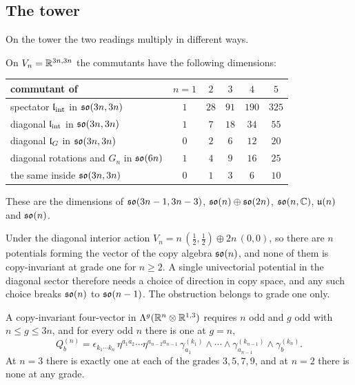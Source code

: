 \subsection{The tower}

On the tower the two readings multiply in different ways.

\begin{proposition}
\label{prop:commutantsn}
On $V_n=\mathbb{R}^{3n,3n}$ the commutants have the following dimensions:
\begin{center}
\begin{tabular}{@{}lccccc@{}}
\toprule
commutant of & $n=1$ & $2$ & $3$ & $4$ & $5$\\
\midrule
spectator $\mathfrak l_{\rm int}$ in $\mathfrak{so}(3n,3n)$ & $1$ & $28$ & $91$ & $190$ & $325$\\
diagonal $\mathfrak l_{\rm int}$ in $\mathfrak{so}(3n,3n)$ & $1$ & $7$ & $18$ & $34$ & $55$\\
diagonal $\mathfrak l_G$ in $\mathfrak{so}(3n,3n)$ & $0$ & $2$ & $6$ & $12$ & $20$\\
diagonal rotations and $G_n$ in $\mathfrak{so}(6n)$ & $1$ & $4$ & $9$ & $16$ & $25$\\
the same inside $\mathfrak{so}(3n,3n)$ & $0$ & $1$ & $3$ & $6$ & $10$\\
\bottomrule
\end{tabular}
\end{center}
These are the dimensions of $\mathfrak{so}(3n-1,3n-3)$, $\mathfrak{so}(n)\oplus\mathfrak{so}(2n)$, $\mathfrak{so}(n,\mathbb{C})$, $\mathfrak{u}(n)$ and $\mathfrak{so}(n)$.
\end{proposition}

Under the diagonal interior action $V_n=n\,(\tfrac12,\tfrac12)\oplus2n\,(0,0)$, so there are $n$ potentials forming the vector of the copy
algebra $\mathfrak{so}(n)$, and none of them is copy-invariant at grade one for $n\ge2$. A single univectorial potential in the diagonal sector
therefore needs a choice of direction in copy space, and any such choice breaks $\mathfrak{so}(n)$ to $\mathfrak{so}(n-1)$. The obstruction belongs to grade
one only.

\begin{theorem}
\label{thm:copyparity}
A copy-invariant four-vector in $\Lambda^g(\mathbb{R}^n\otimes\mathbb{R}^{1,3})$ requires $n$ odd and $g$ odd with $n\le g\le3n$, and for every odd $n$
there is one at $g=n$,
\[
Q^{(n)}_b=\epsilon_{k_1\cdots k_n}\,\eta^{a_1a_2}\cdots\eta^{a_{n-2}a_{n-1}}\,\gamma^{(k_1)}_{a_1}\wedge\cdots\wedge\gamma^{(k_{n-1})}_{a_{n-1}}\wedge\gamma^{(k_n)}_b .
\]
At $n=3$ there is exactly one at each of the grades $3,5,7,9$, and at $n=2$ there is none at any grade.
\end{theorem}

